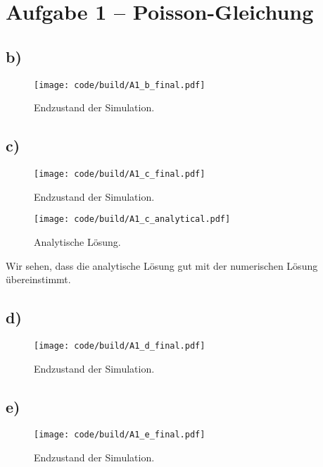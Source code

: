\section{Aufgabe 1 – Poisson-Gleichung}
\label{sec:A1}

\FloatBarrier
\subsection{b)}
\begin{figure}
    \centering
    \texttt{[image: code/build/A1\_b\_final.pdf]}
    \caption{Endzustand der Simulation.}
    \label{fig:b_final}
\end{figure}

\FloatBarrier
\subsection{c)}
\begin{figure}
    \centering
    \texttt{[image: code/build/A1\_c\_final.pdf]}
    \caption{Endzustand der Simulation.}
    \label{fig:c_final}
\end{figure}

\begin{figure}
    \centering
    \texttt{[image: code/build/A1\_c\_analytical.pdf]}
    \caption{Analytische Lösung.}
    \label{fig:c_final}
\end{figure}

Wir sehen, dass die analytische Lösung gut mit der numerischen Lösung übereinstimmt.

\FloatBarrier
\subsection{d)}
\begin{figure}
    \centering
    \texttt{[image: code/build/A1\_d\_final.pdf]}
    \caption{Endzustand der Simulation.}
    \label{fig:d_final}
\end{figure}

\FloatBarrier
\subsection{e)}
\begin{figure}
    \centering
    \texttt{[image: code/build/A1\_e\_final.pdf]}
    \caption{Endzustand der Simulation.}
    \label{fig:e_final}
\end{figure}
